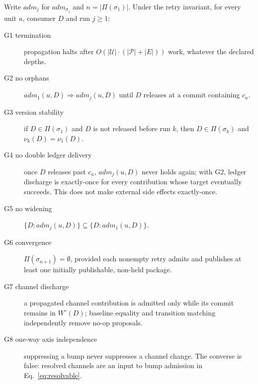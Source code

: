 \documentclass[sigconf,nonacm]{acmart}
\newcommand{\G}[1]{G#1}
\begin{document}
\begin{theorem}
\label{thm:g}
Write $\mathit{adm}_j$ for $\mathit{adm}_{\sigma_j}$ and $n =
|\Pi(\sigma_1)|$. Under the retry invariant, for every unit $u$, consumer
$D$ and run $j \geq 1$:
\begin{description}
  \item[\G{1} termination] propagation halts after $O(|\mathcal{U}|
    \cdot (|\mathcal{P}|{+}|E|))$ work, whatever the declared depths.
  \item[\G{2} no orphans] $\mathit{adm}_1(u,D) \Rightarrow
    \mathit{adm}_j(u,D)$ until $D$ releases at a commit containing
    $c_u$.
  \item[\G{3} version stability] if $D \in \Pi(\sigma_1)$ and $D$ is not
    released before run $k$, then $D \in \Pi(\sigma_k)$ and $\nu_k(D) =
    \nu_1(D)$.
  \item[\G{4} no double ledger delivery] once $D$ releases past $c_u$,
    $\mathit{adm}_j(u,D)$ never holds again; with \G{2}, ledger discharge is
    exactly-once for every contribution whose target eventually succeeds.
    This does not make external side effects exactly-once.
  \item[\G{5} no widening] $\{D : \mathit{adm}_j(u,D)\} \subseteq
    \{D : \mathit{adm}_1(u,D)\}$.
  \item[\G{6} convergence] $\Pi(\sigma_{n+1}) = \emptyset$, provided
    each nonempty retry admits and publishes at least one initially
    publishable, non-held package.
  \item[\G{7} channel discharge] a propagated channel contribution is
    admitted only while its commit remains in $W^\circ(D)$; baseline
    equality and transition matching independently remove no-op proposals.
  \item[\G{8} one-way axis independence] suppressing a bump never
    suppresses a channel change. The converse is false: resolved channels
    are an input to bump admission in Eq.~\ref{eq:resolvable}.
\end{description}
\end{theorem}
\end{document}
